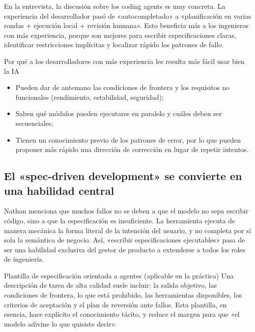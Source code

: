 \documentclass[a4paper]{article}
\begin{document}
En la entrevista, la discusión sobre los coding agents es muy concreta. La experiencia del desarrollador pasó de «autocompletado» a «planificación en varias rondas + ejecución local + revisión humana». Esto beneficia más a los ingenieros con más experiencia, porque son mejores para escribir especificaciones claras, identificar restricciones implícitas y localizar rápido los patrones de fallo.

\begin{importantbox}{Por qué a los desarrolladores con más experiencia les resulta más fácil usar bien la IA}
\begin{itemize}[leftmargin=1.5em]
    \item Pueden dar de antemano las condiciones de frontera y los requisitos no funcionales (rendimiento, estabilidad, seguridad);
    \item Saben qué módulos pueden ejecutarse en paralelo y cuáles deben ser secuenciales;
    \item Tienen un conocimiento previo de los patrones de error, por lo que pueden proponer más rápido una dirección de corrección en lugar de repetir intentos.
\end{itemize}
\end{importantbox}

\subsection{El «spec-driven development» se convierte en una habilidad central}

Nathan menciona que muchos fallos no se deben a que el modelo no sepa escribir código, sino a que la especificación es insuficiente. La herramienta ejecuta de manera mecánica la forma literal de la intención del usuario, y no completa por sí sola la semántica de negocio. Así, «escribir especificaciones ejecutables» pasa de ser una habilidad exclusiva del gestor de producto a extenderse a todos los roles de ingeniería.

\begin{knowledgebox}{Plantilla de especificación orientada a agentes (aplicable en la práctica)}
Una descripción de tarea de alta calidad suele incluir: la salida objetivo, las condiciones de frontera, lo que está prohibido, las herramientas disponibles, los criterios de aceptación y el plan de reversión ante fallos. Esta plantilla, en esencia, hace explícito el conocimiento tácito, y reduce el margen para que «el modelo adivine lo que quisiste decir».
\end{knowledgebox}
\end{document}
